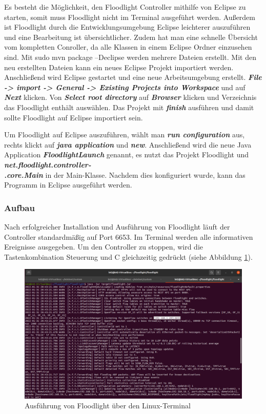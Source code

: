 \documentclass[fontsize=12pt,paper=a4,open=any,parskip=half,
  twoside=false,toc=listof,toc=bibliography,fleqn,leqno,
  captions=nooneline,captions=tableabove,british]{scrbook}
\begin{document}
Es besteht die Möglichkeit, den Floodlight Controller mithilfe von Eclipse zu starten, somit muss Floodlight nicht im Terminal ausgeführt werden. Außerdem ist Floodlight durch die Entwicklungsumgebung Eclipse leichterer auszuführen und eine Bearbeitung ist übersichtlicher. Zudem hat man eine schnelle Übersicht vom kompletten Conroller, da alle Klassen in einem Eclipse Ordner einzusehen sind. Mit sudo mvn package –Declipse werden mehrere Dateien erstellt. Mit den neu erstellten Dateien kann ein neues Eclipse Projekt importiert werden. Anschließend wird Eclipse gestartet und eine neue Arbeitsumgebung erstellt. \textit{\textbf{File -> import -> General -> Existing Projects into Workspace}} und auf \textit{\textbf{Next}} klicken. Von \textit{\textbf{Select root directory}} auf \textit{\textbf{Browser}} klicken und Verzeichnis das Floodlight enthält auswählen. Das Projekt mit \textit{\textbf{finish}} ausführen und damit sollte Floodlight auf Eclipse importiert sein.\par
Um Floodlight auf Eclipse auszuführen, wählt man \textit{\textbf{run configuration}} aus, rechts klickt auf \textit{\textbf{java application}} und \textit{\textbf{new}}. Anschließend wird die neue Java Application \textit{\textbf{FloodlightLaunch}} genannt, es nutzt das Projekt Floodlight und \textit{\textbf{net.floodlight.controller-\\.core.Main}} in der Main-Klasse. Nachdem dies konfiguriert wurde, kann das Programm in Eclipse ausgeführt werden.


\subsubsection{Aufbau}
Nach erfolgreicher Installation und Ausführung von Floodlight läuft der Controller standardmäßig auf Port 6653. Im Terminal werden alle informativen Ereignisse ausgegeben. Um den Controller zu stoppen, wird die Tastenkombination Steuerung und C gleichzeitig gedrückt (siehe Abbildung \ref{floodlight}).

\begin{figure}[htbp]
 \centering
 \includegraphics[width=1.0\textwidth]{Bilder/floodlight}
 \captionsetup{justification=centering,margin=1cm}
 \caption{Ausführung von Floodlight über den Linux-Terminal}
 \label{floodlight}
\end{figure}
\end{document}
